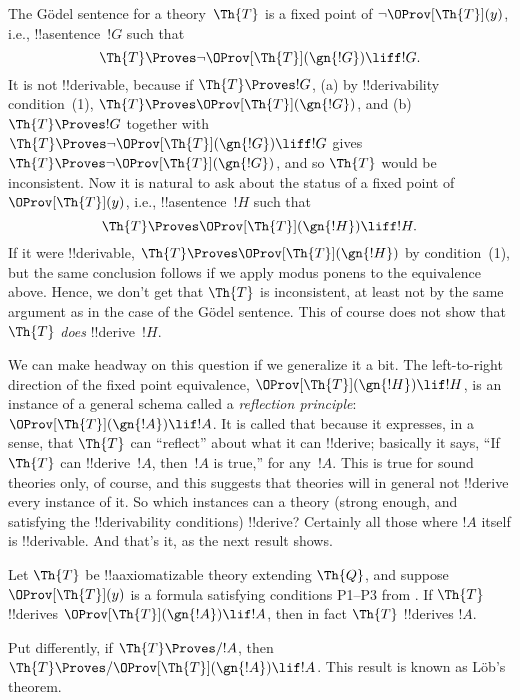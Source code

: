 \documentclass[../../../include/open-logic-section]{subfiles}
\begin{document}


The G\"odel sentence for a theory~$\Th{T}$ is a fixed point of $\lnot
\OProv[\Th{T}](y)$, i.e., !!a{sentence}~$!G$ such that
\[
\Th{T} \Proves \lnot \OProv[\Th{T}](\gn{!G}) \liff !G.
\]
It is not !!{derivable}, because if $\Th{T} \Proves !G$, (a) by !!{derivability}
condition~(1), $\Th{T} \Proves \OProv[\Th{T}](\gn{!G})$, and (b) $\Th{T}
\Proves !G$ together with $\Th{T} \Proves \lnot \OProv[\Th{T}](\gn{!G})
\liff !G$ gives $\Th{T} \Proves \lnot \OProv[\Th{T}](\gn{!G})$, and so
$\Th{T}$ would be inconsistent.  Now it is natural to ask about the
status of a fixed point of $\OProv[\Th{T}](y)$, i.e., !!a{sentence}~$!H$
such that
\[
\Th{T} \Proves \OProv[\Th{T}](\gn{!H}) \liff !H.
\]
If it were !!{derivable}, $\Th{T} \Proves \OProv[\Th{T}](\gn{!H})$ by
condition~(1), but the same conclusion follows if we apply modus
ponens to the equivalence above. Hence, we don't get that $\Th{T}$ is
inconsistent, at least not by the same argument as in the case of the
G\"odel sentence. This of course does not show that $\Th{T}$
\emph{does} !!{derive}~$!H$.

We can make headway on this question if we generalize it a bit. The
left-to-right direction of the fixed point equivalence,
$\OProv[\Th{T}](\gn{!H}) \lif !H$, is an instance of a general schema
called a \emph{reflection principle}: $\OProv[\Th{T}](\gn{!A}) \lif !A$.
It is called that because it expresses, in a sense, that $\Th{T}$ can
``reflect'' about what it can !!{derive}; basically it says, ``If $\Th{T}$
can !!{derive}~$!A$, then~$!A$ is true,'' for any~$!A$.  This is true for
sound theories only, of course, and this suggests that theories will
in general not !!{derive} every instance of it.  So which instances can a
theory (strong enough, and satisfying the !!{derivability} conditions)
!!{derive}?  Certainly all those where $!A$ itself is !!{derivable}. And that's
it, as the next result shows.

\begin{thm}
Let $\Th{T}$ be !!a{axiomatizable} theory extending $\Th{Q}$, and
suppose $\OProv[\Th{T}](y)$ is a formula satisfying conditions P1--P3 from
. If $\Th{T}$ !!{derive}s $\OProv[\Th{T}](\gn{!A}) \lif !A$,
then in fact $\Th{T}$ !!{derive}s $!A$.
\end{thm}

Put differently, if $\Th{T} \Proves/ !A$, then $\Th{T} \Proves/
\OProv[\Th{T}](\gn{!A}) \lif !A$. This result is known as L\"ob's
theorem.
\end{document}
